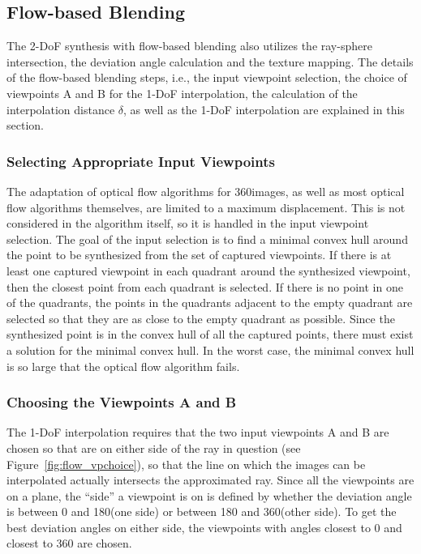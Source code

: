 \subsection{Flow-based Blending}
The 2-DoF synthesis with flow-based blending also utilizes the ray-sphere intersection, the deviation angle calculation and the texture mapping. The details of the flow-based blending steps, i.e., the input viewpoint selection, the choice of viewpoints A and B for the 1-DoF interpolation, the calculation of the interpolation distance $\delta$, as well as the 1-DoF interpolation are explained in this section. 

\subsubsection{Selecting Appropriate Input Viewpoints}
The adaptation of optical flow algorithms for 360\degree images, as well as most optical flow algorithms themselves, are limited to a maximum displacement. This is not considered in the algorithm itself, so it is handled in the input viewpoint selection. The goal of the input selection is to find a minimal convex hull around the point to be synthesized from the set of captured viewpoints.
If there is at least one captured viewpoint in each quadrant around the synthesized viewpoint, then the closest point from each quadrant is selected. If there is no point in one of the quadrants, the points in the quadrants adjacent to the empty quadrant are selected so that they are as close to the empty quadrant as possible. Since the synthesized point is in the convex hull of all the captured points, there must exist a solution for the minimal convex hull. In the worst case, the minimal convex hull is so large that the optical flow algorithm fails.

\subsubsection{Choosing the Viewpoints A and B}
The 1-DoF interpolation requires that the two input viewpoints A and B are chosen so that are on either side of the ray in question (see Figure~\ref{fig:flow_vpchoice}), so that the line on which the images can be interpolated actually intersects the approximated ray. Since all the viewpoints are on a plane, the ``side'' a viewpoint is on is defined by whether the deviation angle is between 0 and 180\degree (one side) or between 180 and 360\degree (other side). 
To get the best deviation angles on either side, the viewpoints with angles closest to 0 and closest to 360 are chosen.

